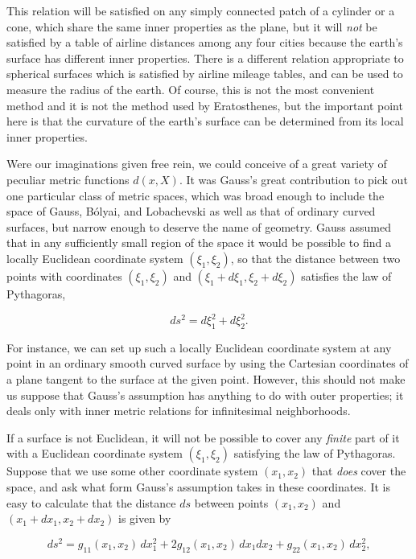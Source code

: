 This relation will be satisfied on any simply connected patch of a cylinder
or a cone, which share the same inner properties as the plane, but it will
\emph{not} be satisfied by a table of airline distances among any four cities
because the earth's surface has different inner properties. There is a
different relation appropriate to spherical surfaces which is satisfied by
airline mileage tables, and can be used to measure the radius of the earth. Of
course, this is not the most convenient method and it is not the method used by
Eratosthenes, but the important point here is that the curvature of the earth's
surface can be determined from its local inner properties.

Were our imaginations given free rein, we could conceive of a great variety of
peculiar metric functions \(d(x,X)\). It was Gauss's great contribution to
pick out one particular class of metric spaces, which was broad enough to
include the space of Gauss, B\'olyai, and Lobachevski as well as that of
ordinary curved surfaces, but narrow enough to deserve the name of geometry.
Gauss assumed that in any sufficiently small region of the space it would be
possible to find a locally Euclidean coordinate system \((\xi_1,\xi_2)\), so
that the distance between two points with coordinates \((\xi_1,\xi_2)\) and
\((\xi_1+d\xi_1,\xi_2+d\xi_2)\) satisfies the law of Pythagoras,

\begin{equation}
  ds^2=d\xi_1^2+d\xi_2^2.
  \tag{1.1.5}\label{eq:1.1.5}
\end{equation}

For instance, we can set up such a locally Euclidean coordinate system at any
point in an ordinary smooth curved surface by using the Cartesian coordinates
of a plane tangent to the surface at the given point. However, this should not
make us suppose that Gauss's assumption has anything to do with outer
properties; it deals only with inner metric relations for infinitesimal
neighborhoods.

If a surface is not Euclidean, it will not be possible to cover any
\emph{finite} part of it with a Euclidean coordinate system
\((\xi_1,\xi_2)\) satisfying the law of Pythagoras. Suppose that we use some
other coordinate system \((x_1,x_2)\) that \emph{does} cover the space, and
ask what form Gauss's assumption takes in these coordinates. It is easy to
calculate that the distance \(ds\) between points \((x_1,x_2)\) and
\((x_1+dx_1,x_2+dx_2)\) is given by

\begin{equation}
  ds^2=g_{11}(x_1,x_2)\,dx_1^2
      +2g_{12}(x_1,x_2)\,dx_1dx_2
      +g_{22}(x_1,x_2)\,dx_2^2,
  \tag{1.1.6}\label{eq:1.1.6}
\end{equation}

